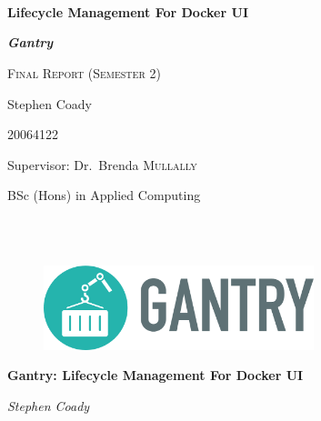 \begin{titlepage}
	\centering
	\mbox{}\\
	\mbox{}\\
	\mbox{}\\
	{\huge\bfseries Lifecycle Management For Docker UI \par}
	{\Large\bfseries \textit{Gantry}\par}
	\vspace{1cm}
	{\scshape\large Final Report (Semester 2)\par}
	\vspace{3cm}
	{\Large Stephen Coady\par}
	{\Large 20064122\par}
	\vspace{3cm}\par
	\vfill
	{\Large Supervisor: Dr.~Brenda \textsc{Mullally}}
	\vspace{1cm}\par
	{\Large BSc (Hons) in Applied Computing\par}


	\vfill
	
	\clearpage
	\thispagestyle{empty}
	\centering
	\mbox{}\\
	\mbox{}\\
	\begin{figure}[!ht]
	\centering
	\includegraphics*[width=0.7\textwidth]{images/gantry-single-darktext}
	\label{fig:gantry-single-darktext}
	\end{figure}
	
	{\huge\bfseries Gantry: Lifecycle Management For Docker UI \par}
	\vspace{1cm}
	{\Large \textit{Stephen Coady}\par}
	\vspace{3cm}\par
	\vfill
	\vspace{1cm}\par


	\vfill
\end{titlepage}
